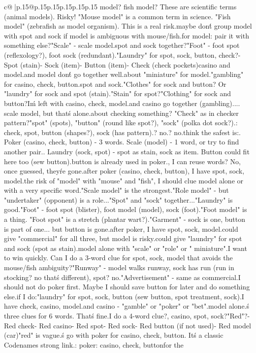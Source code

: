 \documentclass{article}
\begin{document}
{\begin{supertabular}{c@{$\;$}|p{.15\linewidth}@{}p{.15\linewidth}p{.15\linewidth}p{.15\linewidth}p{.15\linewidth}p{.15\linewidth}}
{{{model? fish model? These are scientific terms (animal models). Risky! "Mouse model" is a common term in science. "Fish model" (zebrafish as model organism). This is a real risk.\n\nSo maybe don\'t group model with spot and sock if model is ambiguous with mouse/fish.\n\nAlternative for model: pair it with something else?\n"Scale" - scale model.\nThen spot and sock together?\n"Foot" - foot spot (reflexology?), foot sock (redundant).\n\n"Laundry" for spot, sock, button, check?\n- Spot (stain)\n- Sock (item)\n- Button (item)\n- Check (check pockets)\nThen casino and model.\nCasino and model don\'t go together well.\n\nWhat about "miniature" for model.\nAnd "gambling" for casino, check, button.\nThen spot and sock.\n"Clothes" for sock and button? Or "laundry" for sock and spot (stain).\n\n"Stain" for spot?\n"Clothing" for sock and button?\nThen I\'m left with casino, check, model.\n\nCheck and casino go together (gambling).\nModel... scale model, but that\'s alone.\n\nWhat about checking something? "Check" as in checker pattern?\nThen "spot" (spots), "button" (round like spot?), "sock" (polka dot sock?).\nPattern: check, spot, button (shapes?), sock (has pattern).\nModel? no.\nCasino? no.\n\nI think the safest is:. Poker (casino, check, button) - 3 words. Scale (model) - 1 word, or try to find another pair.. Laundry (sock, spot) - spot as stain, sock as item. Button could fit here too (sew button).\n\nBut button is already used in poker.\n\nWait, I can reuse words? No, once guessed, they\'re gone.\n\nSo after poker (casino, check, button), I have spot, sock, model.\n\nGiven the risk of "model" with "mouse" and "fish", I should clue model alone or with a very specific word.\n"Scale model" is the strongest.\n"Role model" - but "undertaker" (opponent) is a role...\n\n"Spot" and "sock" together...\n"Laundry" is good.\n"Foot" - foot spot (blister), foot model (model), sock (foot).\n"Foot model" is a thing. "Foot spot" is a stretch (plantar wart?).\n"Garment" - sock is one, button is part of one... but button is gone.\n\nSo after poker, I have spot, sock, model.\nI could give "commercial" for all three, but model is risky.\nI could give "laundry" for spot and sock (spot as stain).\nThen model alone with "scale" or "role" or " miniature".\n\nBut I want to win quickly. Can I do a 3-word clue for spot, sock, model that avoids the mouse/fish ambiguity?\n"Runway" - model walks runway, sock has run (run in stocking? no that\'s different), spot? no.\n"Advertisement" - same as commercial.\n\nMaybe I should not do poker first. Maybe I should save button for later and do something else.\n\nWhat if I do:\n"laundry" for spot, sock, button (sew button, spot treatment, sock).\nThen I have check, casino, model.\nCheck and casino - "gamble" or "poker" or "bet".\nThen model alone.\n\nThat\'s three clues for 6 words. That\'s fine.\n\nCan I do a 4-word clue?\nCheck, casino, spot, sock?\n"Red"?\n- Red check\n- Red casino\n- Red spot\n- Red sock\n- Red button (if not used)\n- Red model (car)\n\nBut "red" is vague.\n\nLet\'s go with poker for casino, check, button. It\'s a classic Codenames strong link.\n\nCLUE: poker\nTARGETS: casino, check, button\n\nThen for the }}}
\end{supertabular}}
\end{document}
